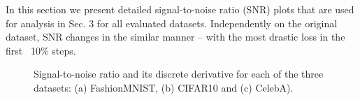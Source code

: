 In this section we present detailed signal-to-noise ratio (SNR) plots that are used for analysis in Sec. 3 for all evaluated datasets. Independently on the original dataset, SNR changes in the similar manner -- with the most drastic loss in the first ~10\% steps.
\begin{figure}[htb!]
	\centering
    \quad
    \quad
	\caption{Signal-to-noise ratio and its discrete derivative for each of the three datasets: (a) FashionMNIST, (b) CIFAR10 and (c) CelebA).}
	\label{fig:snr_per_dataset} 
\vspace*{\baselineskip}
\end{figure}

